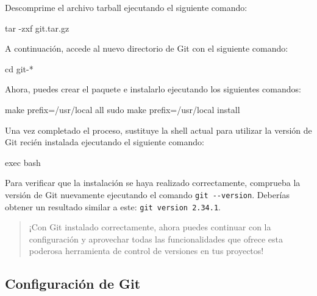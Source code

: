 \documentclass[
  a4paper,
]{article}
\newenvironment{Shaded}{}{}
\newcommand{\AttributeTok}[1]{\textcolor[rgb]{0.84,0.23,0.29}{#1}}
\newcommand{\BuiltInTok}[1]{\textcolor[rgb]{0.84,0.23,0.29}{#1}}
\newcommand{\FunctionTok}[1]{\textcolor[rgb]{0.44,0.26,0.76}{#1}}
\newcommand{\NormalTok}[1]{\textcolor[rgb]{0.14,0.16,0.18}{#1}}
\newcommand{\PreprocessorTok}[1]{\textcolor[rgb]{0.84,0.23,0.29}{#1}}
\begin{document}
Descomprime el archivo tarball ejecutando el siguiente comando:

\begin{Shaded}
\begin{Highlighting}[]
\FunctionTok{tar} \AttributeTok{{-}zxf}\NormalTok{ git.tar.gz}
\end{Highlighting}
\end{Shaded}

A continuación, accede al nuevo directorio de Git con el siguiente
comando:

\begin{Shaded}
\begin{Highlighting}[]
\BuiltInTok{cd}\NormalTok{ git{-}}\PreprocessorTok{*}
\end{Highlighting}
\end{Shaded}

Ahora, puedes crear el paquete e instalarlo ejecutando los siguientes
comandos:

\begin{Shaded}
\begin{Highlighting}[]
\FunctionTok{make}\NormalTok{ prefix=/usr/local all}
\FunctionTok{sudo}\NormalTok{ make prefix=/usr/local install}
\end{Highlighting}
\end{Shaded}

Una vez completado el proceso, sustituye la shell actual para utilizar
la versión de Git recién instalada ejecutando el siguiente comando:

\begin{Shaded}
\begin{Highlighting}[]
\BuiltInTok{exec}\NormalTok{ bash}
\end{Highlighting}
\end{Shaded}

Para verificar que la instalación se haya realizado correctamente,
comprueba la versión de Git nuevamente ejecutando el comando
\texttt{git\ -\/-version}. Deberías obtener un resultado similar a este:
\texttt{git\ version\ 2.34.1}.

\begin{quote}
¡Con Git instalado correctamente, ahora puedes continuar con la
configuración y aprovechar todas las funcionalidades que ofrece esta
poderosa herramienta de control de versiones en tus proyectos!
\end{quote}

\subsection{Configuración de Git}\label{configuraciuxf3n-de-git}
\end{document}
